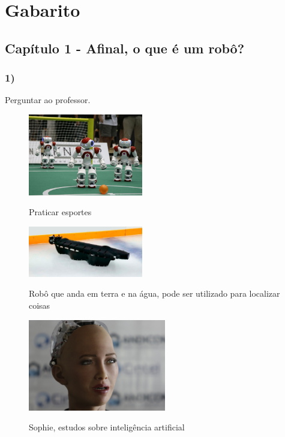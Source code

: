 \chapter*{Gabarito}

\section*{Capítulo 1 - Afinal, o que é um robô?}

    \subsection*{1)}
    Perguntar ao professor.
        \begin{multicols}{3}
            \begin{figure}[H]
            \caption{Praticar esportes}
     
            \centering 
            \includegraphics[width=5cm]{Figuras/NAO.jpg}
            \label{figura:NAO.jpeg}
            \end{figure}
        
            \begin{figure}[H]
            \caption{Robô que anda em terra e na água, pode ser utilizado para localizar coisas}
     
            \centering 
            \includegraphics[width=5cm]{Figuras/anfibio.jpg}
            \label{figura:anfibio.jpeg}
            \end{figure}

            \begin{figure}[H]
            \caption{Sophie, estudos sobre inteligência artificial}
     
            \centering 
            \includegraphics[width=6cm]{Figuras/sophie.jpeg}
            \label{figura:sophie.jpeg}
            \end{figure}
        \end{multicols}
        
